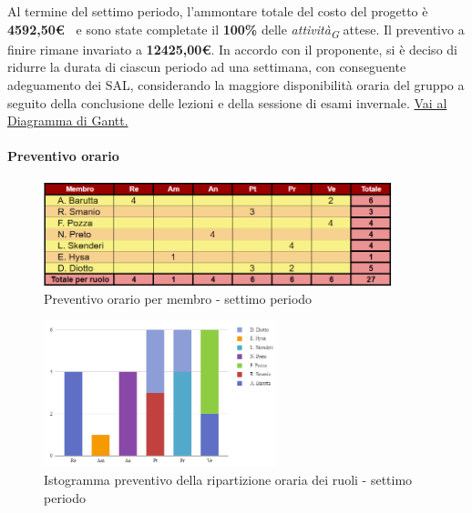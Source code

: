 Al termine del settimo periodo, l'ammontare totale del costo del progetto è \textbf{ 4592,50\euro\ } e sono state completate il \textbf{100\%} delle \textit{attività}\textsubscript{\textit{G}} attese.
Il preventivo a finire rimane invariato a \textbf{12425,00€}.
In accordo con il proponente, si è deciso di ridurre la durata di ciascun periodo ad una settimana, con conseguente adeguamento dei SAL, considerando la maggiore disponibilità oraria del gruppo a seguito della conclusione delle lezioni e della sessione di esami invernale.
\href{https://github.com/orgs/ByteOps-swe/projects/3/views/1?sortedBy%5Bdirection%5D=asc&sortedBy%5BcolumnId%5D=64182560}{Vai al Diagramma di Gantt.}

\pagebreak

\paragraph{Preventivo orario}

\begin{figure}[H] 
    \centering
    \includegraphics[width=0.9\textwidth]{../Images/preventivoOrario7Periodo.png}
    \caption{Preventivo orario per membro - settimo periodo}
    \label{fig:Preventivo_orario_7}
\end{figure}

\vspace{0.6cm}

\begin{figure}[H]
    \centering
    \includegraphics[width=0.6\textwidth]{../Images/preventivoDivisioneRuoli7Periodo.png}
    \caption{Istogramma preventivo della ripartizione oraria dei ruoli - settimo periodo}
    \label{fig:Preventivo_ripartizione_oraria_7}
\end{figure}


